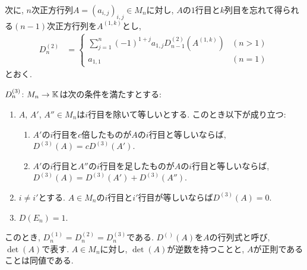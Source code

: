 次に, 
$n$次正方行列$A=(a_{i,j})_{i,j}\in M_n$に対し,
$A$の$1$行目と$k$列目を忘れて得られる$(n-1)$次正方行列を$A^{(1,k)}$とし,
\begin{align*}
D_n^{(2)}
&=
\begin{cases}
\sum_{j=1}^{n} (-1)^{1+j}a_{1,j}D_{n-1}^{(2)}(A^{(1,k)}) & (n>1)\\
a_{1,1}&(n=1)
\end{cases}
\end{align*}
とおく.

$D^{(3)}_n\colon M_n \to \mathbb{K}$は次の条件を満たすとする:
\begin{enumerate}
\item $A$, $A'$, $A''\in M_n$は$i$行目を除いて等しいとする. このとき以下が成り立つ:
\begin{enumerate}
\item $A'$の$i$行目を$c$倍したものが$A$の$i$行目と等しいならば, $D^{(3)}(A)=c D^{(3)}(A')$.
\item $A'$の$i$行目と$A''$の$i$行目を足したものが$A$の$i$行目と等しいならば, $D^{(3)}(A)=D^{(3)}(A')+D^{(3)}(A'')$.
\end{enumerate}
\item $i\neq i'$とする.  $A\in M_n$の$i$行目と$i'$行目が等しいならば$D^{(3)}(A)=0$.
\item $D(E_n)=1$.
\end{enumerate}

このとき, $D^{(1)}_n=D^{(2)}_n=D^{(3)}_n$である.
$D^{()}(A)$を$A$の行列式と呼び, $\det(A)$で表す.
$A\in M_n$に対し,
$\det(A)$が逆数を持つことと, $A$が正則であることは同値である.


